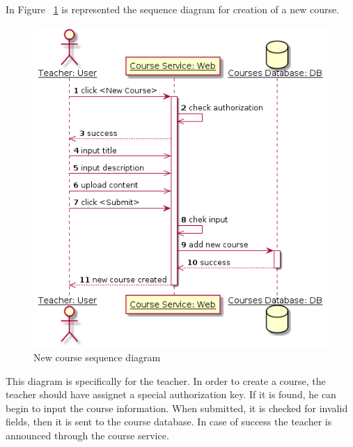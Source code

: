 \documentclass[12pt,a4paper,titlepage]{article}
\begin{document}
In Figure ~\ref{fig:3create} is represented the sequence diagram for creation of a new course.
\begin{figure}[H]
	\centering
	\includegraphics[width=15cm]{3create}
	\caption{New course sequence diagram}
	\label{fig:3create}
\end{figure}
This diagram is specifically for the teacher. In order to create a course, the teacher should have assignet a special authorization key. If it is found, he can begin to input the course information. When submitted, it is checked for invalid fields, then it is sent to the course database. In case of success the teacher is announced through the course service.
\end{document}
